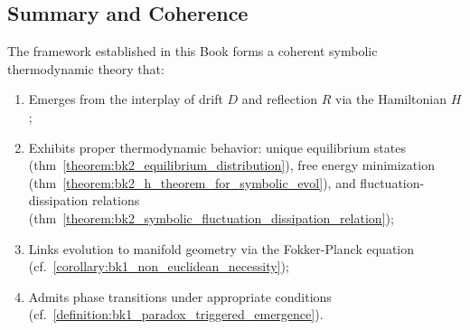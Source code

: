 \subsection{Summary and Coherence}
\label{subsec:bk2_summary_interpretive_framework}

\begin{theorem} 
\label{theorem:bk2_coherence_of_symbolic_therm} 
The framework established in this Book forms a coherent symbolic thermodynamic theory that:
\begin{enumerate}
    \item Emerges from the interplay of drift $D$ and reflection $R$ via the Hamiltonian $H$;
    \item Exhibits proper thermodynamic behavior: unique equilibrium states (thm~\ref{theorem:bk2_equilibrium_distribution}), free energy minimization (thm~\ref{theorem:bk2_h_theorem_for_symbolic_evol}), and fluctuation-dissipation relations (thm~\ref{theorem:bk2_symbolic_fluctuation_dissipation_relation});
    \item Links evolution to manifold geometry via the Fokker-Planck equation (cf.~\ref{corollary:bk1_non_euclidean_necessity});
    \item Admits phase transitions under appropriate conditions (cf.~\ref{definition:bk1_paradox_triggered_emergence}).
\end{enumerate}
\end{theorem}

